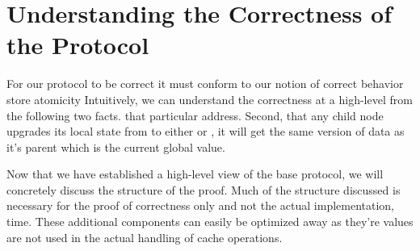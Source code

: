 \section{Understanding the Correctness of the Protocol}
\label{Sec:ProofStructure}

For our protocol to be correct it must conform to our notion of
correct behavior \eg{} store atomicity Intuitively, we can understand
the correctness at a high-level from the following two facts.  that
particular address. Second, that any child node upgrades its local
state from \In to either \Sh or \Mo, it will get the same version of
data as it's parent which is the current global value.









Now that we have established a high-level view of the base protocol,
we will concretely discuss the structure of the proof. Much of the
structure discussed is necessary for the proof of correctness only and
not the actual implementation, \eg{} time. These additional components
can easily be optimized away as they're values are not used in the
actual handling of cache operations.
